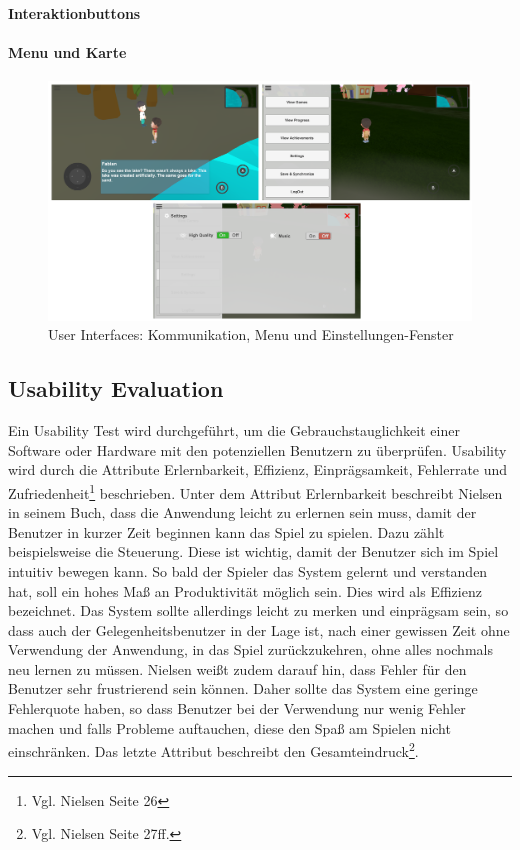 			\paragraph{Interaktionbuttons}
			
			\paragraph{Menu und Karte}
			
				\begin{figure}[htbp]
					\centering 
					\label{userInterfaces}
					\includegraphics[width=\textwidth]{pics/userInterface.png}
					\caption{User Interfaces: Kommunikation, Menu und Einstellungen-Fenster}
				\end{figure}
		
	\subsection{Usability Evaluation}
		Ein Usability Test wird durchgeführt, um die Gebrauchstauglichkeit einer Software oder Hardware mit den potenziellen Benutzern zu überprüfen. Usability wird durch die Attribute Erlernbarkeit, Effizienz, Einprägsamkeit, Fehlerrate und Zufriedenheit\footnote{Vgl. Nielsen \cite{NielsenUI} Seite 26} beschrieben. Unter dem Attribut Erlernbarkeit beschreibt Nielsen in seinem Buch, dass die Anwendung leicht zu erlernen sein muss, damit der Benutzer in kurzer Zeit beginnen kann das Spiel zu spielen. Dazu zählt beispielsweise die Steuerung. Diese ist wichtig, damit der Benutzer sich im Spiel intuitiv bewegen kann. So bald der Spieler das System gelernt und verstanden hat, soll ein hohes Maß an Produktivität möglich sein. Dies wird als Effizienz bezeichnet. Das System sollte allerdings leicht zu merken und einprägsam sein, so dass auch der Gelegenheitsbenutzer in der Lage ist, nach einer gewissen Zeit ohne Verwendung der Anwendung, in das Spiel zurückzukehren, ohne alles nochmals neu lernen zu müssen. Nielsen weißt zudem darauf hin, dass Fehler für den Benutzer sehr frustrierend sein können. Daher sollte das System eine geringe Fehlerquote haben, so dass Benutzer bei der Verwendung nur wenig Fehler machen und falls Probleme auftauchen, diese den Spaß am Spielen nicht einschränken. Das letzte Attribut beschreibt den Gesamteindruck\footnote{Vgl. Nielsen \cite{NielsenUI} Seite 27ff.}.
		
